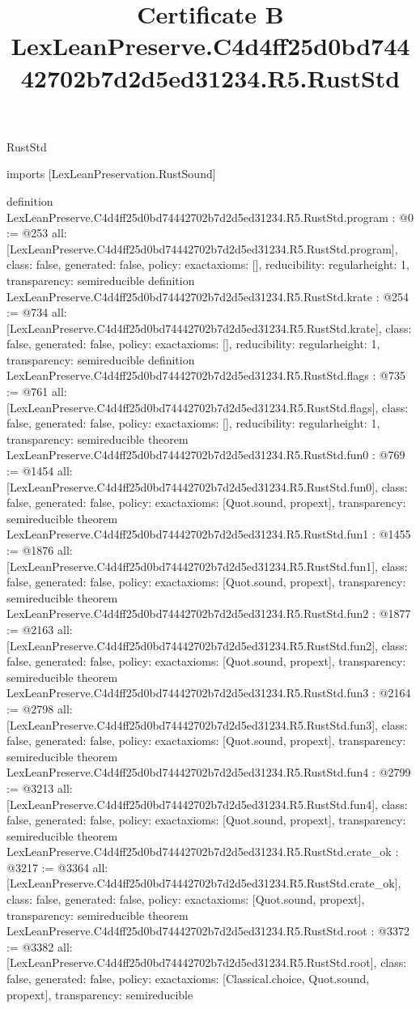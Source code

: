 \begin{lexlean}{RustStd}
\title{Certificate B LexLeanPreserve.C4d4ff25d0bd74442702b7d2d5ed31234.R5.RustStd}
\begin{coremodule}
imports [LexLeanPreservation.RustSound]

definition LexLeanPreserve.C4d4ff25d0bd74442702b7d2d5ed31234.R5.RustStd.program : @0 := @253 {
  all: [LexLeanPreserve.C4d4ff25d0bd74442702b7d2d5ed31234.R5.RustStd.program],
  class: false,
  generated: false,
  policy: exact{axioms: []},
  reducibility: regular{height: 1},
  transparency: semireducible
}
definition LexLeanPreserve.C4d4ff25d0bd74442702b7d2d5ed31234.R5.RustStd.krate : @254 := @734 {
  all: [LexLeanPreserve.C4d4ff25d0bd74442702b7d2d5ed31234.R5.RustStd.krate],
  class: false,
  generated: false,
  policy: exact{axioms: []},
  reducibility: regular{height: 1},
  transparency: semireducible
}
definition LexLeanPreserve.C4d4ff25d0bd74442702b7d2d5ed31234.R5.RustStd.flags : @735 := @761 {
  all: [LexLeanPreserve.C4d4ff25d0bd74442702b7d2d5ed31234.R5.RustStd.flags],
  class: false,
  generated: false,
  policy: exact{axioms: []},
  reducibility: regular{height: 1},
  transparency: semireducible
}
theorem LexLeanPreserve.C4d4ff25d0bd74442702b7d2d5ed31234.R5.RustStd.fun0 : @769 := @1454 {
  all: [LexLeanPreserve.C4d4ff25d0bd74442702b7d2d5ed31234.R5.RustStd.fun0],
  class: false,
  generated: false,
  policy: exact{axioms: [Quot.sound, propext]},
  transparency: semireducible
}
theorem LexLeanPreserve.C4d4ff25d0bd74442702b7d2d5ed31234.R5.RustStd.fun1 : @1455 := @1876 {
  all: [LexLeanPreserve.C4d4ff25d0bd74442702b7d2d5ed31234.R5.RustStd.fun1],
  class: false,
  generated: false,
  policy: exact{axioms: [Quot.sound, propext]},
  transparency: semireducible
}
theorem LexLeanPreserve.C4d4ff25d0bd74442702b7d2d5ed31234.R5.RustStd.fun2 : @1877 := @2163 {
  all: [LexLeanPreserve.C4d4ff25d0bd74442702b7d2d5ed31234.R5.RustStd.fun2],
  class: false,
  generated: false,
  policy: exact{axioms: [Quot.sound, propext]},
  transparency: semireducible
}
theorem LexLeanPreserve.C4d4ff25d0bd74442702b7d2d5ed31234.R5.RustStd.fun3 : @2164 := @2798 {
  all: [LexLeanPreserve.C4d4ff25d0bd74442702b7d2d5ed31234.R5.RustStd.fun3],
  class: false,
  generated: false,
  policy: exact{axioms: [Quot.sound, propext]},
  transparency: semireducible
}
theorem LexLeanPreserve.C4d4ff25d0bd74442702b7d2d5ed31234.R5.RustStd.fun4 : @2799 := @3213 {
  all: [LexLeanPreserve.C4d4ff25d0bd74442702b7d2d5ed31234.R5.RustStd.fun4],
  class: false,
  generated: false,
  policy: exact{axioms: [Quot.sound, propext]},
  transparency: semireducible
}
theorem LexLeanPreserve.C4d4ff25d0bd74442702b7d2d5ed31234.R5.RustStd.crate_ok : @3217 := @3364 {
  all: [LexLeanPreserve.C4d4ff25d0bd74442702b7d2d5ed31234.R5.RustStd.crate_ok],
  class: false,
  generated: false,
  policy: exact{axioms: [Quot.sound, propext]},
  transparency: semireducible
}
theorem LexLeanPreserve.C4d4ff25d0bd74442702b7d2d5ed31234.R5.RustStd.root : @3372 := @3382 {
  all: [LexLeanPreserve.C4d4ff25d0bd74442702b7d2d5ed31234.R5.RustStd.root],
  class: false,
  generated: false,
  policy: exact{axioms: [Classical.choice, Quot.sound, propext]},
  transparency: semireducible
}


\end{coremodule}
\end{lexlean}
